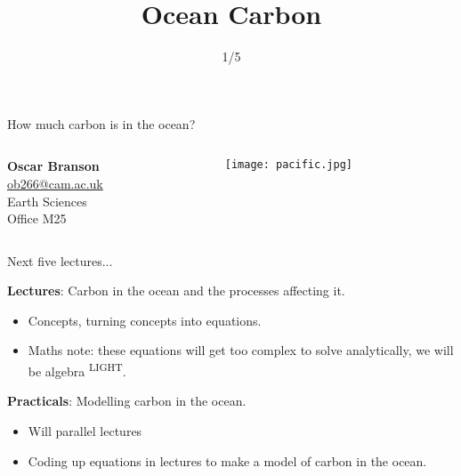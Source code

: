 \documentclass[aspectratio=169]{beamer}
\title{Ocean Carbon}
\author{1/5}
\begin{document}
\begin{frame}{How much carbon is in the ocean?}
    \begin{columns}
        \begin{column}{0.3\linewidth}
            \textbf{Oscar Branson} \\ 
            \bigskip
            \href{mailto:ob266@cam.ac.uk}{ob266@cam.ac.uk} \\
            Earth Sciences \\
            Office M25
        \end{column}
        \begin{column}{0.7\linewidth}
            \texttt{[image: pacific.jpg]}
        \end{column}
    \end{columns}
\end{frame}

\begin{frame}{Next five lectures...}

\textbf{Lectures}: Carbon in the ocean and the processes affecting it.

\begin{itemize}
    \item Concepts, turning concepts into equations. 
    \item Maths note: these equations will get too complex to solve analytically, we will be algebra \textsuperscript{LIGHT}.
\end{itemize}

\bigskip

\textbf{Practicals}: Modelling carbon in the ocean.

\begin{itemize}
    \item Will parallel lectures
    \item Coding up equations in lectures to make a model of carbon in the ocean.
\end{itemize}

\end{frame}
\end{document}
